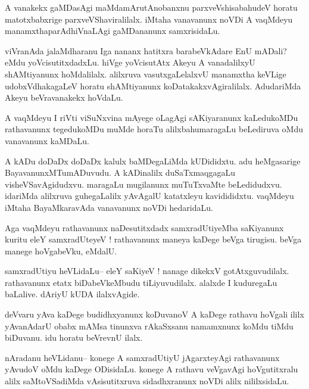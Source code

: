 \documentclass{article}
\begin{document}
\begin{mn}%
A vanakekx gaMDasAgi maMdamArutAnobanxnu parxveVshisabahudeV horatu matotxbabxrige 
parxveVShaviralilalx. iMtaha vanavanunx noVDi A vaqMdeyu manamxthaparAdhiVnaLAgi 
gaMDananunx samxrisidaLu.
\end{mn}

\begin{mn}%
viVranAda jalaMdharanu Iga nananx hatitxra barabeVkAdare EnU mADali? eMdu yoVcisutitxdadxLu. 
hiVge yoVcisutAtx Akeyu A vanadalilxyU shAMtiyanunx hoMdalilalx. alilxruva vasutxgaLelalxvU 
manamxtha keVLige udobxVdhakagaLeV horatu shAMtiyanunx koDatakakxvAgiralilalx. AdudariMda 
Akeyu beVravanakekx hoVdaLu.
\end{mn}

\begin{mn}%
A vaqMdeyu I riVti viSuNxvina mAyege oLagAgi sAKiyaranunx kaLedukoMDu rathavanunx 
tegedukoMDu muMde horaTu alilxbahumaragaLu beLediruva oMdu vanavanunx kaMDaLu.
\end{mn}

\begin{mn}%
A kADu doDaDx doDaDx kalulx baMDegaLiMda kUDididxtu. adu heMgasarige BayavanunxMTumADuvudu. 
A kADinalilx duSaTxmaqgagaLu visheVSavAgidudxvu. maragaLu mugilanunx muTuTxvaMte  
beLedidudxvu. idariMda alilxruva guhegaLalilx yAvAgalU katatxleyu kavidididxtu. vaqMdeyu 
iMtaha BayaMkaravAda vanavanunx noVDi hedaridaLu.
\end{mn}

\begin{mn}%
Aga vaqMdeyu rathavanunx naDesutitxdadx samxradUtiyeMba saKiyanunx kuritu eleY samxradUteyeV 
! rathavanunx maneya kaDege beVga tirugisu. beVga manege hoVgabeVku, eMdalU.
\end{mn}

\begin{mn}%
samxradUtiyu heVLidaLu-- eleY saKiyeV ! nanage dikekxV gotAtxguvudilalx. rathavanunx etatx 
biDabeVkeMbudu tiLiyuvudilalx. alalxde I kuduregaLu baLalive. dAriyU kUDA ilalxvAgide.
\end{mn}

\begin{mn}%
deVvaru yAva kaDege budidhxyanunx koDuvanoV A kaDege rathavu hoVgali ililx yAvanAdarU obabx 
mAMsa tinunxva rAkaSxsanu namamxnunx koMdu tiMdu biDuvanu. idu horatu beVrevnU ilalx.
\end{mn}

\begin{mn}%
nAradanu heVLidanu-- konege A samxradUtiyU jAgarxteyAgi rathavanunx yAvudoV oMdu kaDege 
ODisidaLu. konege A rathavu veVgavAgi hoVgutitxralu alilx saMtoVSadiMda vAsisutitxruva 
sidadhxranunx noVDi alilx nililxsidaLu.
\end{mn}
\end{document}
